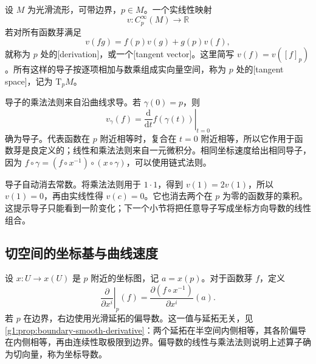 \begin{definition}
	\label{g1:def:tangent-derivation}
	设 \(M\) 为光滑流形，可带边界，\(p\in M\)。一个实线性映射
	\[
		v:C^\infty_p(M)\longrightarrow\mathbb R
	\]
	若对所有函数芽满足
	\[
		v(fg)=f(p)v(g)+g(p)v(f),
	\]
	就称为 \(p\) 处的[derivation]，或一个[tangent vector]。这里简写 \(v(f)=v([f]_p)\)。所有这样的导子按逐项相加与数乘组成实向量空间，称为 \(p\) 处的[tangent space]，记为 \(\mathrm{T}_pM\)。
\end{definition}

导子的乘法法则来自沿曲线求导。若 \(\gamma(0)=p\)，则
\[
	v_\gamma(f)=\left.\frac{\mathrm{d}}{\mathrm{d}t}f(\gamma(t))\right|_{t=0}
\]
确为导子。代表函数在 \(p\) 附近相等时，复合在 \(t=0\) 附近相等，所以它作用于函数芽是良定义的；线性和乘法法则来自一元微积分。相同坐标速度给出相同导子，因为 \(f\circ\gamma=(f\circ x^{-1})\circ(x\circ\gamma)\)，可以使用链式法则。

\ProseParagraphBreak

导子自动消去常数。将乘法法则用于 \(1\cdot1\)，得到 \(v(1)=2v(1)\)，所以 \(v(1)=0\)，再由实线性得 \(v(c)=0\)。它也消去两个在 \(p\) 为零的函数芽的乘积。这提示导子只能看到一阶变化；下一个小节将把任意导子写成坐标方向导数的线性组合。

\subsection{切空间的坐标基与曲线速度}
\label{g1:subsec:1102:02}

设 \(x:U\to x(U)\) 是 \(p\) 附近的坐标图，记 \(a=x(p)\)。对于函数芽 \(f\)，定义
\[
	\left.\frac{\partial}{\partial x^i}\right|_p(f)
	=\frac{\partial(f\circ x^{-1})}{\partial x^i}(a).
\]
若 \(p\) 在边界，右边使用光滑延拓的偏导数。这一值与延拓无关，见\cref{g1:prop:boundary-smooth-derivative}：两个延拓在半空间内侧相等，其各阶偏导在内侧相等，再由连续性取极限到边界。偏导数的线性与乘法法则说明上述算子确为切向量，称为坐标导数。

